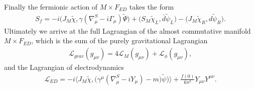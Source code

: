 Finally the fermionic action of $M\times F_{ED}$ takes the form
    \begin{align}
        S_f = -i\big(J_M\tilde{\chi}, \gamma(\nabla^S_\mu - i\Gamma_\mu)
        \tilde{\Psi}\big) + \big(S_M\tilde{\chi}_L, \bar{d}\tilde{\psi}_L\big) -
        \big(J_M\tilde{\chi}_R, d \tilde{\psi}_R\big).
    \end{align}
Ultimately we arrive at the full Lagrangian of the almost commutative
manifold $M\times F_{ED}$, which is the sum of the purely gravitational
Lagrangian
\begin{align}\label{eq:final1}
        \mathcal{L}_{grav}(g_{\mu\nu})=4\mathcal{L}_M(g_{\mu\nu})+
        \mathcal{L}_\phi (g_{\mu\nu}),
    \end{align}
and the Lagrangian of electrodynamics
\begin{align}\label{eq:final2}
        \mathcal{L}_{ED} = -i\bigg\langle
        J_M\tilde{\chi},\big(\gamma^\mu(\nabla^S_\mu - iY_\mu) -m\big)\tilde{\psi})
        \bigg\rangle
        +\frac{f(0)}{6\pi^2} Y_{\mu\nu}Y^{\mu\nu}.
    \end{align}

